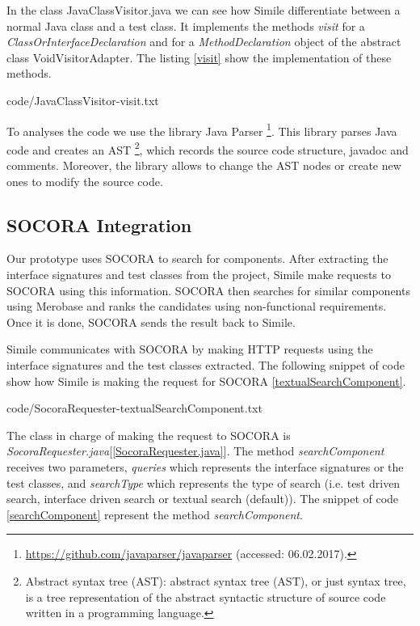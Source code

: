 In the class JavaClassVisitor.java we can see how Simile differentiate between a normal Java class and a test class. It implements the methods \emph{visit} for a \emph{ClassOrInterfaceDeclaration} and for a \emph{MethodDeclaration} object of the abstract class VoidVisitorAdapter. The listing \ref{visit} show the implementation of these methods.


{code/JavaClassVisitor-visit.txt}

To analyses the code we use the library Java Parser \footnote{\url{https://github.com/javaparser/javaparser} (accessed: 06.02.2017).}. This library parses Java code and creates an AST \footnote{Abstract syntax tree (AST): abstract syntax tree (AST), or just syntax tree, is a tree representation of the abstract syntactic structure of source code written in a programming language.}, which records the source code structure, javadoc and comments. Moreover, the library allows to change the AST nodes or create new ones to modify the source code.

\subsection{SOCORA Integration}
\label{socora-integration}
Our prototype uses SOCORA to search for components. After extracting the interface signatures and test classes from the project, Simile make requests to SOCORA using this information. SOCORA then searches for similar components using Merobase and ranks the candidates using non-functional requirements. Once it is done, SOCORA sends the result back to Simile.

Simile communicates with SOCORA by making HTTP requests using the interface signatures and the test classes extracted. The following snippet of code show how Simile is making the request for SOCORA \ref{textualSearchComponent}.


{code/SocoraRequester-textualSearchComponent.txt}

The class in charge of making the request to SOCORA is \emph{SocoraRequester.java}[\ref{SocoraRequester.java}]. The method \emph{searchComponent} receives two parameters, \emph{queries} which represents the interface signatures or the test classes, and \emph{searchType} which represents the type of search (i.e. test driven search, interface driven search or textual search (default)). The snippet of code \ref{searchComponent} represent the method \emph{searchComponent}.

